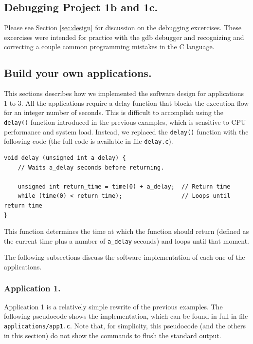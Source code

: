 \documentclass[letterpaper, 12pt]{article}
\begin{document}
\subsection{Debugging Project 1b and 1c.}
Please see Section \ref{sec:design} for discussion on the debugging excercises.  These excercises were intended for practice with the gdb debugger and recognizing and correcting a couple common programming mistakes in the C language.

\subsection{Build your own applications.}

This sections describes how we implemented the software design for applications 1 to 3. All the applications require a delay function that blocks the execution flow for an integer number of seconds. This is difficult to accomplish using the \verb+delay()+ function introduced in the previous examples, which is sensitive to CPU performance and system load. Instead, we replaced the \verb+delay()+ function with the following code (the full code is available in file \verb+delay.c+).

\begin{lstlisting}
void delay (unsigned int a_delay) {
    // Waits a_delay seconds before returning.

    unsigned int return_time = time(0) + a_delay;  // Return time
    while (time(0) < return_time);                 // Loops until return time
}
\end{lstlisting}

This function determines the time at which the function should return (defined as the current time plus a number of \verb+a_delay+ seconds) and loops until that moment.

The following subsections discuss the software implementation of each one of the applications.

\subsubsection{Application 1.}

Application 1 is a relatively simple rewrite of the previous examples. The following pseudocode shows the implementation, which can be found in full in file \verb+applications/app1.c+. Note that, for simplicity, this pseudocode (and the others in this section) do not show the commands to flush the standard output.
\end{document}
